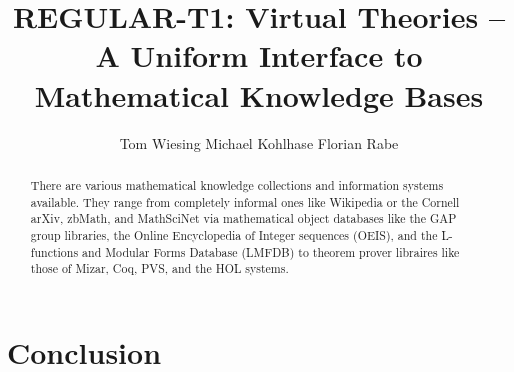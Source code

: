 \documentclass{llncs}
\title{REGULAR-T1: Virtual Theories -- A Uniform Interface to Mathematical Knowledge Bases}
\author{
Tom Wiesing\inst{1}
Michael Kohlhase\inst{1} 
Florian Rabe\inst{2} 
}
\institute{
   FAU Erlangen-N\"urnberg
   \and Jacobs University Bremen
}
\begin{document}
\maketitle
\begin{abstract}
  There are various mathematical knowledge collections and information systems
  available. They range from completely informal ones like Wikipedia or the Cornell arXiv,
  zbMath, and MathSciNet via mathematical object databases like the GAP group libraries,
  the Online Encyclopedia of Integer sequences (OEIS), and the L-functions and Modular
  Forms Database (LMFDB) to theorem prover libraires like those of Mizar, Coq, PVS, and
  the HOL systems.
\end{abstract}







\section{Conclusion}\label{sec:concl}

\printbibliography
\end{document}
